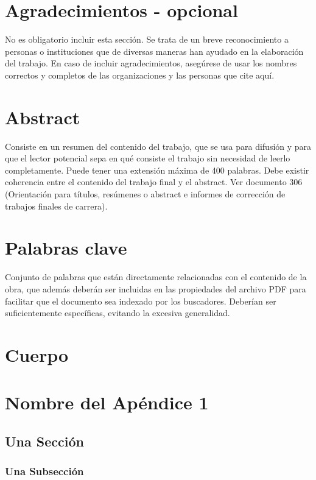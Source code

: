 \documentclass[12pt,a4paper,oneside]{book}
\begin{document}
\chapter*{Agradecimientos - opcional}
No  es  obligatorio  incluir  esta  sección.  Se  trata  de  un  breve  reconocimiento  a  personas  o  instituciones que de diversas maneras han ayudado en la elaboración del trabajo. En  caso  de  incluir  agradecimientos,  asegúrese  de  usar  los  nombres  correctos  y  completos  de  las  organizaciones y las personas que cite aquí.

\chapter*{Abstract}
Consiste  en  un  resumen  del  contenido  del  trabajo,  que  se  usa  para  difusión  y  para  que  el  lector  potencial sepa en qué consiste el trabajo sin necesidad de leerlo completamente. Puede tener una extensión máxima de 400 palabras. Debe existir coherencia entre el contenido del trabajo final y el  abstract.  Ver  documento  306  (Orientación  para  títulos,  resúmenes  o  abstract  e  informes  de  corrección de trabajos finales de carrera).

\chapter*{Palabras clave}
Conjunto  de  palabras  que  están  directamente  relacionadas  con  el  contenido  de  la  obra,  que  además deberán ser incluidas en las propiedades del archivo PDF para facilitar que el documento sea  indexado  por  los  buscadores.  Deberían  ser  suficientemente  específicas,  evitando  la  excesiva  generalidad.

\tableofcontents

\chapter{Cuerpo}
\lipsum[2]





\appendix %

\chapter{Nombre del Apéndice 1}
\cite{girard1989}
\lipsum[1]	
\section{Una Sección}
\lipsum[2-3]
\subsection{Una Subsección}
\lipsum[4-6]
\end{document}

